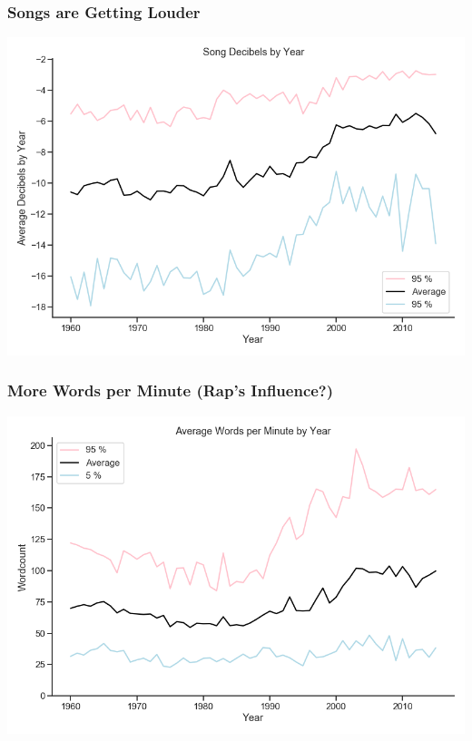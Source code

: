\documentclass[10pt]{beamer}
\begin{document}
\begin{frame}
\frametitle{Songs are Getting Louder}

{
    \centering
    \includegraphics[width=\textwidth, height=\textheight,keepaspectratio]{average_decibels_by_year.png}
    \par
}

\end{frame}

\begin{frame}
\frametitle{More Words per Minute (Rap's Influence?)}

{
    \centering
    \includegraphics[width=\textwidth, height=\textheight,keepaspectratio]{average_words_per_minute_by_year.png}
    \par
}

\end{frame}
\end{document}
